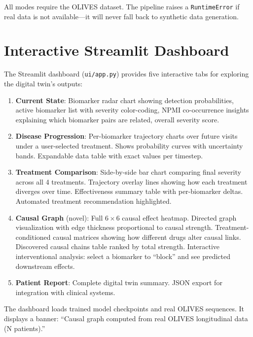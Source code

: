 \documentclass[12pt,a4paper]{article}
\begin{document}
All modes require the OLIVES dataset. The pipeline raises a \texttt{RuntimeError} if real data is not available---it will never fall back to synthetic data generation.

\section{Interactive Streamlit Dashboard}

The Streamlit dashboard (\texttt{ui/app.py}) provides five interactive tabs for exploring the digital twin's outputs:

\begin{enumerate}[nosep]
  \item \textbf{Current State}: Biomarker radar chart showing detection probabilities, active biomarker list with severity color-coding, NPMI co-occurrence insights explaining which biomarker pairs are related, overall severity score.

  \item \textbf{Disease Progression}: Per-biomarker trajectory charts over future visits under a user-selected treatment. Shows probability curves with uncertainty bands. Expandable data table with exact values per timestep.

  \item \textbf{Treatment Comparison}: Side-by-side bar chart comparing final severity across all 4 treatments. Trajectory overlay lines showing how each treatment diverges over time. Effectiveness summary table with per-biomarker deltas. Automated treatment recommendation highlighted.

  \item \textbf{Causal Graph} (novel): Full $6 \times 6$ causal effect heatmap. Directed graph visualization with edge thickness proportional to causal strength. Treatment-conditioned causal matrices showing how different drugs alter causal links. Discovered causal chains table ranked by total strength. Interactive interventional analysis: select a biomarker to ``block'' and see predicted downstream effects.

  \item \textbf{Patient Report}: Complete digital twin summary. JSON export for integration with clinical systems.
\end{enumerate}

The dashboard loads trained model checkpoints and real OLIVES sequences. It displays a banner: ``Causal graph computed from real OLIVES longitudinal data (N patients).''
\end{document}
